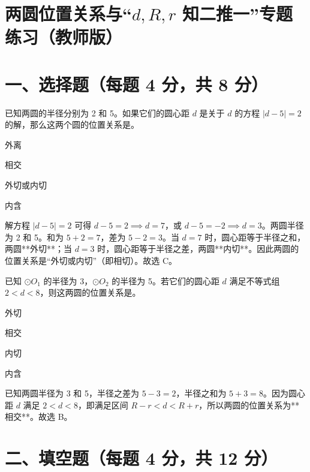 \documentclass{exam-zh}
\begin{document}
\section*{两圆位置关系与“$d, R, r$ 知二推一”专题练习（教师版）}

\section*{一、选择题（每题 4 分，共 8 分）}


\begin{question}[points=4]
  已知两圆的半径分别为 2 和 5。如果它们的圆心距 $d$ 是关于 $d$ 的方程 $|d - 5| = 2$ 的解，那么这两个圆的位置关系是\fillin。
  \begin{choices}
    \item 外离
    \item 相交
    \item 外切或内切
    \item 内含
  \end{choices}
  \paren[C]
  \begin{solutionblock}
    解方程 $|d - 5| = 2$ 可得 $d - 5 = 2 \implies d = 7$，或 $d - 5 = -2 \implies d = 3$。两圆半径为 2 和 5。和为 $5+2=7$，差为 $5-2=3$。当 $d=7$ 时，圆心距等于半径之和，两圆**外切**；当 $d=3$ 时，圆心距等于半径之差，两圆**内切**。因此两圆的位置关系是“外切或内切”（即相切）。故选 C。
  \end{solutionblock}
\end{question}



\begin{question}[points=4]
  已知 $\odot O_1$ 的半径为 3，$\odot O_2$ 的半径为 5。若它们的圆心距 $d$ 满足不等式组 $2 < d < 8$，则这两圆的位置关系是\fillin。
  \begin{choices}
    \item 外切
    \item 相交
    \item 内切
    \item 内含
  \end{choices}
  \paren[B]
  \begin{solutionblock}
    已知两圆半径为 3 和 5，半径之差为 $5-3=2$，半径之和为 $5+3=8$。因为圆心距 $d$ 满足 $2 < d < 8$，即满足区间 $R-r < d < R+r$，所以两圆的位置关系为**相交**。故选 B。
  \end{solutionblock}
\end{question}


\section*{二、填空题（每题 4 分，共 12 分）}
\end{document}
